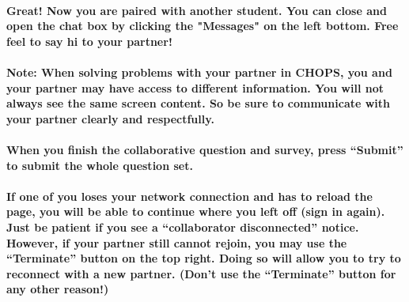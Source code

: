 \paragraph{Great! Now you are paired with another student. You can close and open the chat box by clicking the "Messages" on the left bottom. Free feel to say hi to your partner!\newline}
\paragraph{Note: When solving problems with your partner in CHOPS, you and your partner may have access to different information. You will not always see the same screen content. So be sure to communicate with your partner clearly and respectfully.\newline}
\paragraph{When you ﬁnish the collaborative question and survey, press “Submit” to submit the whole question set.\newline}
\paragraph{If one of you loses your network connection and has to reload the page, you will be able to continue where you left off (sign in again). Just be patient if you see a “collaborator disconnected” notice. However, if your partner still cannot rejoin, you may use the “Terminate” button on the top right. Doing so will allow you to try to reconnect with a new partner. (Don’t use the “Terminate” button for any other reason!)\newline}

